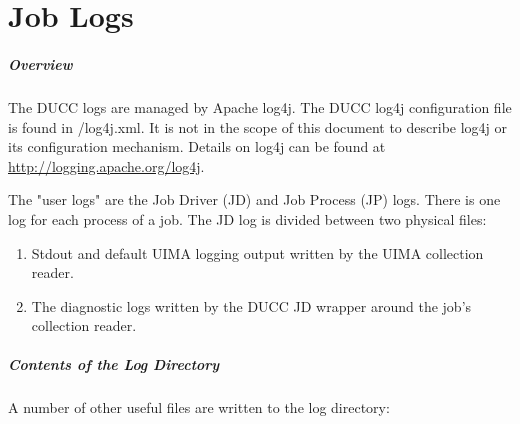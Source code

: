 \ifpdf
\else
{}
\fi
\chapter{Job Logs}
\label{chap:job-logs}

\paragraph{Overview}The DUCC logs are managed by Apache log4j.  The DUCC log4j configuration file is found in
\duccruntime/log4j.xml. It is not in the scope of this document to describe log4j or its
configuration mechanism. Details on log4j can be found at \url{http://logging.apache.org/log4j}.

The "user logs" are the Job Driver (JD) and Job Process (JP) logs. There is one log for each process 
of a job. The JD log is divided between two physical files: 

\begin{enumerate}
   \item Stdout and default UIMA logging output written by the UIMA collection reader.      
   \item The diagnostic logs written by the DUCC JD wrapper around the job's collection reader. 
\end{enumerate}

\paragraph{Contents of the Log Directory} A number of other useful files are written to the log directory: 

